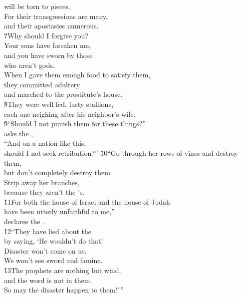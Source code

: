 \begin{poetry}
\poemlll       will be torn to pieces. \\
\poeml For their transgressions are many, \\
\poemll    and their apostasies numerous. \\
\poeml \v{7}Why should I forgive you? \\
\poemll    Your sons have forsaken me, \\
\poeml and you have sworn by those \\
\poemll    who aren't gods. \\
\poeml When I gave them enough food to satisfy them, \\
\poemll    they committed adultery \\
\poemll    and marched to the prostitute's house. \\
\poeml \v{8}They were well-fed, lusty stallions, \\
\poemll    each one neighing after his neighbor's wife. \\
\poeml \v{9}``Should I not punish them for these things?'' \\
\poemll    asks the , \\
\poeml ``And on a nation like this, \\
\poemll    should I not seek retribution?''
\poeml \v{10}``Go through her rows of vines and destroy them, \\
\poemll    but don't completely destroy them. \\
\poeml Strip away her branches, \\
\poemll    because they aren't the 's. \\
\poeml \v{11}For both the house of Israel and the house of Judah \\
\poemll    have been utterly unfaithful to me,'' \\
\poemlll       declares the . \\
\poeml \v{12}``They have lied about the  \\
\poemll    by saying, `He wouldn't do that! \\
\poeml Disaster won't come on us. \\
\poemll    We won't see sword and famine. \\
\poeml \v{13}The prophets are nothing but wind, \\
\poemll    and the word is not in them. \\
\poeml So may the disaster happen to them!'\,''
\end{poetry}

